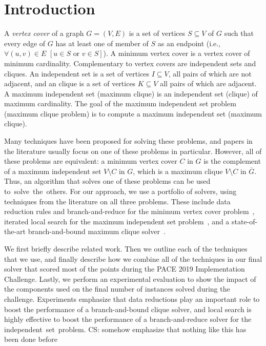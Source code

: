 \documentclass[twoside,leqno,twocolumn]{article}
\newcommand{\csch}[1]{{\color{red} CS: #1}}
\begin{document}
\section{Introduction}

A \emph{vertex cover} of a graph $G=(V,E)$ is a set of vertices $S\subseteq V$ of $G$ such that every edge of $G$ has at least one of member of $S$ as an endpoint (i.e., $\forall (u,v) \in E\,\, [u\in S \textrm{ or } v \in S]$).
A minimum vertex cover is a vertex cover of minimum cardinality. 
Complementary to vertex covers are independent sets and cliques. An independent set is a set of vertices $I\subseteq V$, all pairs of which are not adjacent, and an clique is a set of vertices $K\subseteq V$ all pairs of which are adjacent. A maximum independent set (maximum clique) is an independent set (clique) of maximum cardinality. The goal of the maximum independent set problem (maximum clique problem) is to compute a maximum independent set (maximum clique).

Many techniques have been proposed for solving these problems, and papers in the literature usually focus on one of these problems in particular. However, all of these problems are equivalent: a
minimum vertex cover $C$ in $G$ is the complement of a maximum independent set $V\setminus C$ in $G$, which is a maximum clique $V\setminus C$ in $\overline{G}$. Thus, an algorithm that solves one of these problems can be used to~solve~the~others.
For our approach, we use a portfolio of solvers, using techniques from the literature on all three problems. These include data reduction rules and branch-and-reduce for the minimum vertex cover problem~\cite{akiba-tcs-2016}, iterated local search for the maximum independent set problem~\cite{andrade-2012}, and a state-of-the-art branch-and-bound maximum clique solver~\cite{DBLP:journals/cor/LiJM17}.

We first briefly describe related work. Then we outline each of the techniques that we use, and finally describe how we combine all of the techniques in our final solver that scored most of the points during the PACE 2019 Implementation Challenge. Lastly, we perform an experimental evaluation to show the impact of the components used on the final number of instances solved during the challenge.
Experiments emphasize that data reductions play an important role to boost the performance of a branch-and-bound clique solver, and local search is highly effective to boost the performance of a branch-and-reduce solver for the independent~set~problem. \csch{somehow emphasize that nothing like this has been done before}
\end{document}
